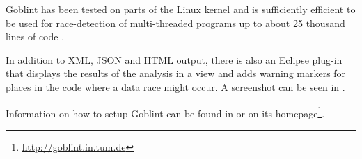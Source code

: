 Goblint has been tested on parts of the Linux kernel and is sufficiently efficient to be used for race-detection of multi-threaded programs up to about 25 thousand lines of code \cite{Vojdani10Thesis,goblint.pdf}.

In addition to XML, JSON and HTML output, there is also an Eclipse plug-in that displays the results of the analysis in a view and adds warning markers for places in the code where a data race might occur. A screenshot can be seen in .

Information on how to setup Goblint can be found in  or on its homepage\footnote{\url{http://goblint.in.tum.de}}.


